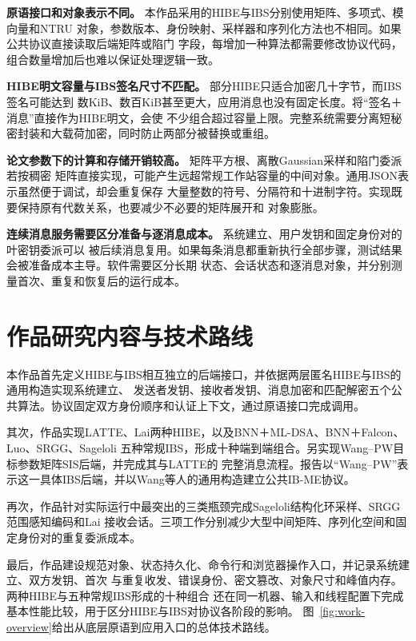 \textbf{原语接口和对象表示不同。} 本作品采用的HIBE与IBS分别使用矩阵、多项式、模向量和NTRU
对象，参数版本、身份映射、采样器和序列化方法也不相同。如果公共协议直接读取后端矩阵或陷门
字段，每增加一种算法都需要修改协议代码，组合数量增加后也难以保证处理逻辑一致。

\textbf{HIBE明文容量与IBS签名尺寸不匹配。} 部分HIBE只适合加密几十字节，而IBS签名可能达到
数KiB、数百KiB甚至更大，应用消息也没有固定长度。将“签名＋消息”直接作为HIBE明文，会使
不少组合超过容量上限。完整系统需要分离短秘密封装和大载荷加密，同时防止两部分被替换或重组。

\textbf{论文参数下的计算和存储开销较高。} 矩阵平方根、离散Gaussian采样和陷门委派若按稠密
矩阵直接实现，可能产生远超常规工作站容量的中间对象。通用JSON表示虽然便于调试，却会重复保存
大量整数的符号、分隔符和十进制字符。实现既要保持原有代数关系，也要减少不必要的矩阵展开和
对象膨胀。

\textbf{连续消息服务需要区分准备与逐消息成本。} 系统建立、用户发钥和固定身份对的叶密钥委派可以
被后续消息复用。如果每条消息都重新执行全部步骤，测试结果会被准备成本主导。软件需要区分长期
状态、会话状态和逐消息对象，并分别测量首次、重复和恢复后的运行成本。

\section{作品研究内容与技术路线}

本作品首先定义HIBE与IBS相互独立的后端接口，并依据两层匿名HIBE与IBS的通用构造实现系统建立、
发送者发钥、接收者发钥、消息加密和匹配解密五个公共算法。协议固定双方身份顺序和认证上下文，通过原语接口完成调用。

其次，作品实现LATTE、Lai两种HIBE，以及BNN＋ML-DSA、BNN＋Falcon、Luo、SRGG、Sageloli
五种常规IBS，形成十种端到端组合。另实现Wang--PW目标参数矩阵SIS后端，并完成其与LATTE的
完整消息流程。报告以“Wang--PW”表示这一具体IBS后端，并以Wang等人的通用构造建立公共IB-ME协议。

再次，作品针对实际运行中最突出的三类瓶颈完成Sageloli结构化环采样、SRGG范围感知编码和Lai
接收会话。三项工作分别减少大型中间矩阵、序列化空间和固定身份对的重复委派成本。

最后，作品建设规范对象、状态持久化、命令行和浏览器操作入口，并记录系统建立、双方发钥、首次
与重复收发、错误身份、密文篡改、对象尺寸和峰值内存。两种HIBE与五种常规IBS形成的十种组合
还在同一机器、输入和线程配置下完成基本性能比较，用于区分HIBE与IBS对协议各阶段的影响。
图~\ref{fig:work-overview}给出从底层原语到应用入口的总体技术路线。

